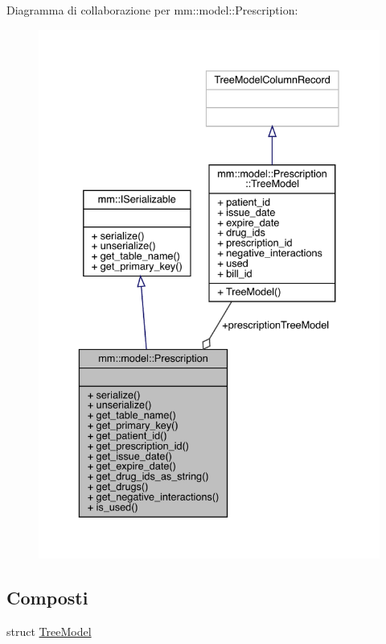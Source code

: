 Diagramma di collaborazione per mm\+:\+:model\+:\+:Prescription\+:\nopagebreak
\begin{figure}[H]
\begin{center}
\leavevmode
\includegraphics[width=335pt]{da/d04/classmm_1_1model_1_1_prescription__coll__graph}
\end{center}
\end{figure}
\subsection*{Composti}
\begin{DoxyCompactItemize}
\item 
struct \hyperlink{structmm_1_1model_1_1_prescription_1_1_tree_model}{Tree\+Model}
\end{DoxyCompactItemize}

